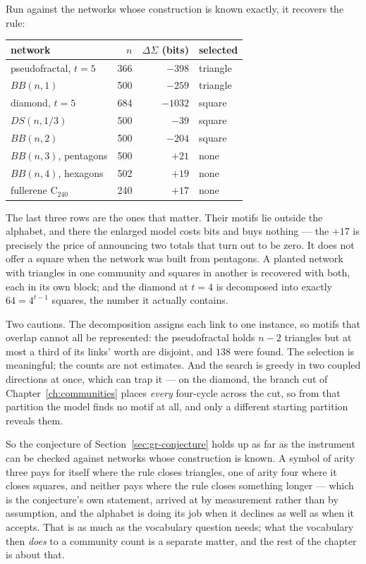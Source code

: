 Run against the networks whose construction is known exactly, it recovers the
rule:

\begin{center}
\begin{tabular}{lrrl}
\hline
network & $n$ & $\Delta\Sigma$ (bits) & selected\\
\hline
pseudofractal, $t=5$      & 366 & $-398$ & triangle\\
$BB(n,1)$                 & 500 & $-259$ & triangle\\
diamond, $t=5$            & 684 & $-1032$ & square\\
$DS(n,1/3)$               & 500 & $-39$  & square\\
$BB(n,2)$                 & 500 & $-204$ & square\\
$BB(n,3)$, pentagons      & 500 & $+21$  & none\\
$BB(n,4)$, hexagons       & 502 & $+19$  & none\\
fullerene $\mathrm{C}_{240}$ & 240 & $+17$ & none\\
\hline
\end{tabular}
\end{center}

\noindent The last three rows are the ones that matter. Their motifs lie outside
the alphabet, and there the enlarged model costs bits and buys nothing --- the
$+17$ is precisely the price of announcing two totals that turn out to be zero.
It does not offer a square when the network was built from pentagons. A planted
network with triangles in one community and squares in another is recovered with
both, each in its own block; and the diamond at $t=4$ is decomposed into exactly
$64=4^{t-1}$ squares, the number it actually contains.

Two cautions. The decomposition assigns each link to one instance, so motifs that
overlap cannot all be represented: the pseudofractal holds $n-2$ triangles but at
most a third of its links' worth are disjoint, and $138$ were found. The
selection is meaningful; the counts are not estimates. And the search is greedy
in two coupled directions at once, which can trap it --- on the diamond, the
branch cut of Chapter~\ref{ch:communities} places \emph{every} four-cycle across
the cut, so from that partition the model finds no motif at all, and only a
different starting partition reveals them.

So the conjecture of Section~\ref{sec:gr-conjecture} holds up as far as the
instrument can be checked against networks whose construction is known. A symbol
of arity three pays for itself where the rule closes triangles, one of arity four
where it closes squares, and neither pays where the rule closes something longer
--- which is the conjecture's own statement, arrived at by measurement rather
than by assumption, and the alphabet is doing its job when it declines as well as
when it accepts. That is as much as the vocabulary question needs; what the
vocabulary then \emph{does} to a community count is a separate matter, and the
rest of the chapter is about that.

